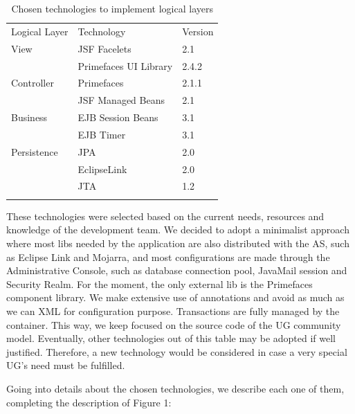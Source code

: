 \documentclass[envcountsame,envcountchap]{svmono}
\begin{document}
\begin{table}
\centering
\caption{Chosen technologies to implement logical layers}
\label{tab:chosen-technologies}
\begin{tabular}{lll}
\hline\noalign{\smallskip}
Logical Layer & Technology & Version \\
\noalign{\smallskip}\hline\noalign{\smallskip}
View & JSF Facelets & 2.1 \\
 & Primefaces UI Library & 2.4.2 \\
\noalign{\smallskip}
Controller & Primefaces & 2.1.1 \\
 & JSF Managed Beans & 2.1 \\
\noalign{\smallskip}
Business & EJB Session Beans & 3.1 \\
 & EJB Timer & 3.1 \\
\noalign{\smallskip}
Persistence & JPA & 2.0 \\
 & EclipseLink & 2.0 \\
 & JTA & 1.2 \\
\noalign{\smallskip}\hline
\end{tabular}
\end{table}

These technologies were selected based on the current needs, resources and knowledge of the development team. We decided to adopt a minimalist approach where most libs needed by the application are also distributed with the AS, such as Eclipse Link and Mojarra, and most configurations are made through the Administrative Console, such as database connection pool, JavaMail session and Security Realm. For the moment, the only external lib is the Primefaces component library. We make extensive use of annotations and avoid as much as we can XML for configuration purpose. Transactions are fully managed by the container. This way, we keep focused on the source code of the UG community model. Eventually, other technologies out of this table may be adopted if well justified. Therefore, a new technology would be considered in case a very special UG's need must be fulfilled.

Going into details about the chosen technologies, we describe each one of them, completing the description of Figure 1:
\end{document}
